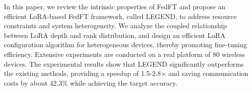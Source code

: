 \vspace{-0.2cm}
In this paper, we review the intrinsic properties of FedFT and propose an efficient LoRA-based FedFT framework, called LEGEND, to address resource constraints and system heterogeneity.
We analyze the coupled relationship between LoRA depth and rank distribution, and design an efficient LoRA configuration algorithm for heterogeneous devices, thereby promoting fine-tuning efficiency.
Extensive experiments are conducted on a real platform of 80 wireless devices. 
The experimental results show that LEGEND significantly outperforms the existing methods, providing a speedup of 1.5-2.8$\times$ and saving communication costs by about 42.3\% while achieving the target accuracy. 